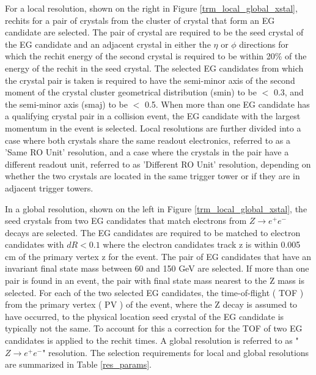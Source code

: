 For a local resolution, shown on the right in Figure \ref{trm_local_global_xstal}, rechits for a pair of crystals from the cluster of crystal that form an EG candidate are selected. The pair of crystal are required to be the seed crystal of the EG candidate and an adjacent crystal in either the $\eta$ or $\phi$ directions for which the rechit energy of the second crystal is required to be within 20\% of the energy of the rechit in the seed crystal. The selected EG candidates from which the crystal pair is taken is required to have the semi-minor axis of the second moment of the crystal cluster geometrical distribution (smin) to be $<$ 0.3, and the semi-minor axis (smaj) to be $<$ 0.5. When more than one EG candidate has a qualifying crystal pair in a collision event, the EG candidate with the largest momentum in the event is selected.  Local resolutions are further divided into a case where both crystals share the same readout electronics, referred to as a 'Same RO Unit' resolution, and a case where the crystals in the pair have a different readout unit, referred to as 'Different RO Unit' resolution, depending on whether the two crystals are located in the same trigger tower or if they are in adjacent trigger towers. 

In a global resolution, shown on the left in Figure \ref{trm_local_global_xstal}, the seed crystals from two EG candidates that match electrons from $Z\rightarrow e^{+}e^{-}$ decays are selected. The EG candidates are required to be matched to electron candidates with $dR < 0.1$ where the electron candidates track z is within 0.005 cm of the primary vertex z for the event. The pair of EG candidates that have an invariant final state mass between 60 and 150 GeV are selected. If more than one pair is found in an event, the pair with final state mass nearest to the Z mass is selected. For each of the two selected EG candidates, the time-of-flight ( TOF ) from the primary vertex ( PV ) of the event, where the Z decay is assumed to have occurred, to the physical location seed crystal of the EG candidate is typically not the same. To account for this a correction for the TOF of two EG candidates is applied to the rechit times. A global resolution is referred to  as "$Z\rightarrow e^{+}e^{-}$" resolution. The selection requirements for local and global resolutions are summarized in Table \ref{res_params}.

